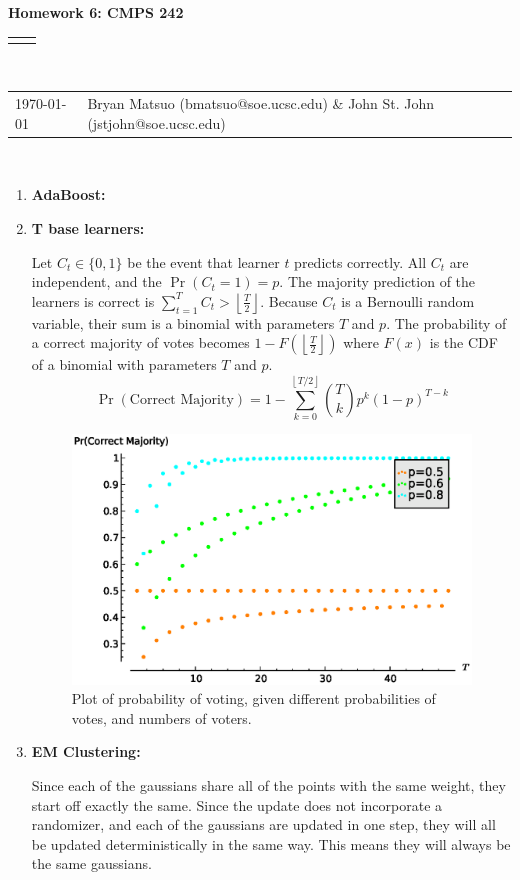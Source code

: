 \documentclass[12pt]{article}
\renewcommand{\title}[1]{\textbf{#1}\\}
\renewcommand{\line}{\begin{tabularx}{\textwidth}{X>{\raggedleft}X}\hline\\\end{tabularx}\\[-0.5cm]}
\newcommand{\leftright}[2]{\begin{tabularx}{\textwidth}{X>{\raggedleft}X}#1%
& #2\\\end{tabularx}\\[-0.5cm]}
\begin{document}
\title{Homework 6: CMPS 242}
\line
\leftright{\today}{Bryan Matsuo (bmatsuo@soe.ucsc.edu) \& John St. John (jstjohn@soe.ucsc.edu)} %
\begin{enumerate}
\item \textbf{AdaBoost:}



\item \textbf{T base learners:}

Let $C_t \in \{0,1\}$ be  the event that learner $t$ predicts correctly. All $C_t$ are independent, and the $\Pr(C_t=1) = p$. The majority prediction of the learners is correct is $\sum_{t=1}^TC_t > \left\lfloor \frac{T}{2} \right\rfloor $. Because $C_t$ is a Bernoulli random variable, their sum is a binomial with parameters $T$ and $p$. The probability of a correct majority of votes becomes $1-F\left(\left\lfloor\frac{T}{2}\right\rfloor\right)$ where $F(x)$ is the CDF of a binomial with parameters $T$ and $p$. 
\begin{equation}
\Pr(\text{Correct Majority}) = 1- \sum_{k=0}^{\left\lfloor T/2 \right\rfloor} {T \choose k}p^k(1-p)^{T-k}
\end{equation}

\begin{figure}[htbp]
\begin{center}
\includegraphics{prob2.eps}
\caption{Plot of probability of voting, given different probabilities of votes, and numbers of voters.}
\label{fig:prob2}
\end{center}
\end{figure}


\item \textbf{EM Clustering:}

Since each of the gaussians share all of the points with the same weight, they start off exactly the same. Since the update does not incorporate a randomizer, and each of the gaussians are updated in one step, they will all be updated deterministically in the same way. This means they will always be the same gaussians.

\end{enumerate}
\end{document}
